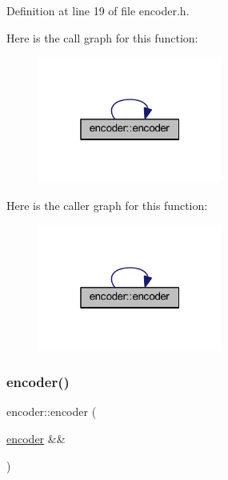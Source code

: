 Definition at line 19 of file encoder.\+h.

Here is the call graph for this function\+:
\nopagebreak
\begin{figure}[H]
\begin{center}
\leavevmode
\includegraphics[width=172pt]{classencoder_a074f819c70398da9ce1af632dc391a19_cgraph}
\end{center}
\end{figure}
Here is the caller graph for this function\+:
\nopagebreak
\begin{figure}[H]
\begin{center}
\leavevmode
\includegraphics[width=172pt]{classencoder_a074f819c70398da9ce1af632dc391a19_icgraph}
\end{center}
\end{figure}
\mbox{\label{classencoder_a612e51df8504a258ebab3f6cc296d0c4}} 
\subsubsection{\texorpdfstring{encoder()}{encoder()}\hspace{0.1cm}{\footnotesize\ttfamily [3/4]}}
{\footnotesize\ttfamily encoder\+::encoder (\begin{DoxyParamCaption}\item[{\mbox{\hyperlink{classencoder}{encoder}} \&\&}]{ }\end{DoxyParamCaption})\hspace{0.3cm}{\ttfamily [default]}}

\mbox{\label{classencoder_a6a9eb2f09a64535bc1105e415af90493}} 
